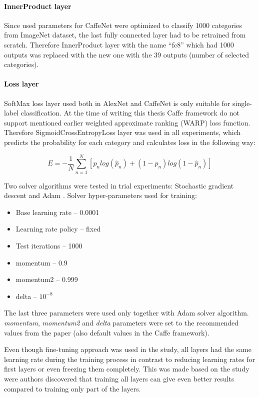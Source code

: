     \paragraph{InnerProduct layer}
    Since used parameters for CaffeNet were optimized to classify 1000 categories from ImageNet dataset, the last fully connected layer had to be retrained from scratch. Therefore InnerProduct layer with the name ``fc8'' which had 1000 outputs was replaced with the new one with the 39 outputs (number of selected categories).
    
    \paragraph{Loss layer}
    SoftMax loss layer used both in AlexNet and CaffeNet is only suitable for single-label classification. At the time of writing this thesis Caffe framework do not support mentioned earlier weighted approximate ranking (WARP) loss function. Therefore SigmoidCrossEntropyLoss layer was used in all experiments, which predicts the probability for each category and calculates loss in the following way:
    
    $$
    E = -\frac{1}{N} \sum_{n=1}^{N} [p_n log (\hat p_n) + (1 - p_n) log(1 - \hat p_n)]
    $$
    
    Two solver algorithms were tested in trial experiments: Stochastic gradient descent \cite{sgd} and Adam \cite{adam}. Solver hyper-parameters used for training:
    \begin{itemize}
        \item Base learning rate -- 0.0001
        \item Learning rate policy -- fixed
        \item Test iterations -- 1000
        \item momentum -- 0.9
        \item momentum2 -- 0.999
        \item delta -- $10^{-8}$
    \end{itemize}
    
    The last three parameters were used only together with Adam solver algorithm. \textit{momentum}, \textit{momentum2} and \textit{delta} parameters were set to the recommended values from the paper \cite{adam} (also default values in the Caffe framework).
    
    Even though fine-tuning approach was used in the study, all layers had the same learning rate during the training process in contrast to reducing learning rates for first layers or even freezing them completely. This was made based on the study \cite{Yosinski2014HowTransferable} were authors discovered that training all layers can give even better results compared to training only part of the layers.
    
